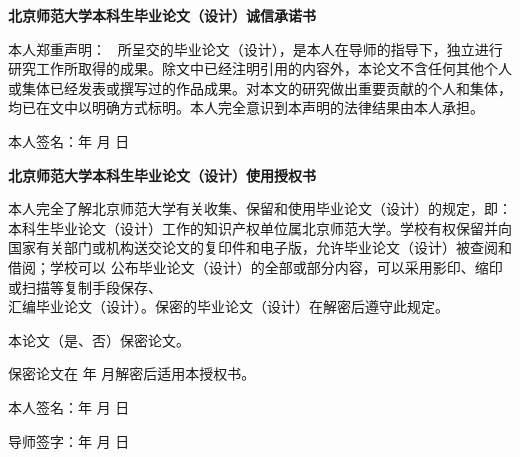 \thispagestyle{empty}
\vspace*{-8mm}
\begin{center}
\ziju{0.1pt}\textbf{北京师范大学本科生毕业论文（设计）诚信承诺书}
\end{center}
\vspace{3.8mm}
\begin{spacing}{1.6}
\ziju{0.05pt}\noindent\phantom{空格}本人郑重声明：~ 所呈交的毕业论文（设计），是本人在导师的指导下，独立进行研究工作所取得的成果。除文中已经注明引用的内容外，本论文不含任何其他个人或集体已经发表或撰写过的作品成果。对本文的研究做出重要贡献的个人和集体，均已在文中以明确方式标明。本人完全意识到本声明的法律结果由本人承担。
\end{spacing}
\vspace{8.3mm}
\hspace{1cm}本人签名：\hfill\myyear 年 \mymonth 月 \myday 日

\vspace{2.05cm}

\begin{center}
	\ziju{0.1pt}\textbf{北京师范大学本科生毕业论文（设计）使用授权书}
\end{center}
\vspace{4mm}
\begin{spacing}{1.6}
	\noindent\phantom{空格}本人完全了解北京师范大学有关收集、保留和使用毕业论文（设计）的规定，即：本科生毕业论文（设计）工作的知识产权单位属北京师范大学。学校有权保留并向国家有关部门或机构送交论文的复印件和电子版，允许毕业论文（设计）被查阅和借阅；学校可以
	\ziju{0.1pt} 公布毕业论文（设计）的全部或部分内容，可以采用影印、缩印或扫描等复制手段保存、\\
	汇编毕业论文（设计）。保密的毕业论文（设计）在解密后遵守此规定。
\end{spacing}
\vspace{17.1mm}
\ziju{0.1pt}\noindent\phantom{空格}本论文（是、否）保密论文。
\vspace{3mm}

\ziju{0pt}\noindent\phantom{空格}保密论文在\underline{\hspace{9.7mm}} 年\underline{\hspace{9.7mm}} 月解密后适用本授权书。
\vspace{1.98cm}

\ziju{0.1pt}\noindent\phantom{空格}本人签名：\hfill\myyear 年 \mymonth 月 \myday 日

\vspace{1.96cm}

\ziju{0.1pt}\noindent\phantom{空格}导师签字：\hfill\myyear 年 \mymonth 月 \myday 日
